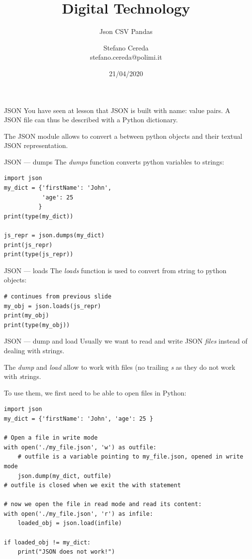 \documentclass[aspectratio=169,handout]{beamer}
\title{Digital Technology}
\subtitle{Json CSV Pandas}
\author{Stefano Cereda\\
		stefano.cereda@polimi.it
	}
\date{21/04/2020}
\institute[PoliMi]{Politecnico Milano}
\begin{document}
\begin{frame}
	\maketitle
\end{frame}

\begin{frame}{JSON}
    You have seen at lesson that JSON is built with name: value pairs.
    A JSON file can thus be described with a Python dictionary.

    The JSON module allows to convert a between python objects and their textual JSON representation.
\end{frame}

\begin{frame}[fragile]{JSON --- dumps}
    The \emph{dumps} function converts python variables to strings:
    \begin{verbatim}
import json
my_dict = {'firstName': 'John',
           'age': 25
          }
print(type(my_dict))

js_repr = json.dumps(my_dict)
print(js_repr)
print(type(js_repr))
    \end{verbatim}
\end{frame}

\begin{frame}[fragile]{JSON --- loads}
    The \emph{loads} function is used to convert from string to python objects:
    \begin{verbatim}
# continues from previous slide
my_obj = json.loads(js_repr)
print(my_obj)
print(type(my_obj))
    \end{verbatim}
\end{frame}


\begin{frame}[fragile]{JSON --- dump and load}
    Usually we want to read and write JSON \emph{files} instead of dealing with strings.

    The \emph{dump} and \emph{load} allow to work with files (no trailing \emph{s} as they do not work with
    \emph{s}trings.

    To use them, we first need to be able to open files in Python:
    \begin{verbatim}
import json
my_dict = {'firstName': 'John', 'age': 25 }

# Open a file in write mode
with open('./my_file.json', 'w') as outfile:
    # outfile is a variable pointing to my_file.json, opened in write mode
    json.dump(my_dict, outfile)
# outfile is closed when we exit the with statement

# now we open the file in read mode and read its content:
with open('./my_file.json', 'r') as infile:
    loaded_obj = json.load(infile)

if loaded_obj != my_dict:
    print("JSON does not work!")
    \end{verbatim}
\end{frame}
\end{document}
